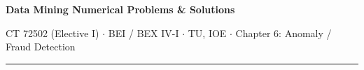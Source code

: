 \documentclass[10pt]{article}
\begin{document}
{\LARGE\bfseries Data Mining \gap\textcolor{sub}{Numerical Problems \& Solutions}}\par
{\footnotesize\color{sub} CT 72502 (Elective I) $\cdot$ BEI / BEX IV-I $\cdot$ TU, IOE $\cdot$ Chapter 6: Anomaly / Fraud Detection}
\vspace{3pt}\hrule\vspace{4pt}




\end{document}
